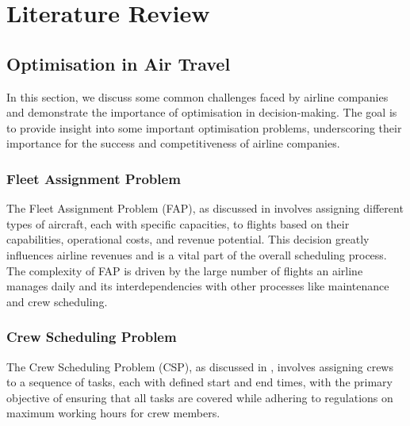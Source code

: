 \chapter{Literature Review}
\label{Chapter2}


\section{Optimisation in Air Travel}

In this section, we discuss some common challenges faced by airline companies and demonstrate the importance of optimisation in decision-making. The goal is to provide insight into some important optimisation problems, underscoring their importance for the success and competitiveness of airline companies.

\subsection{Fleet Assignment Problem}


The Fleet Assignment Problem (FAP), as discussed in \cite{airline_fleet_assignement} involves assigning different types of aircraft, each with specific capacities, to flights based on their capabilities, operational costs, and revenue potential. This decision greatly influences airline revenues and is a vital part of the overall scheduling process. The complexity of FAP is driven by the large number of flights an airline manages daily and its interdependencies with other processes like maintenance and crew scheduling.


\subsection{Crew Scheduling Problem} %

The Crew Scheduling Problem (CSP), as discussed in \cite{crew_scheduling_problem}, involves assigning crews to a sequence of tasks, each with defined start and end times, with the primary objective of ensuring that all tasks are covered while adhering to regulations on maximum working hours for crew members.

